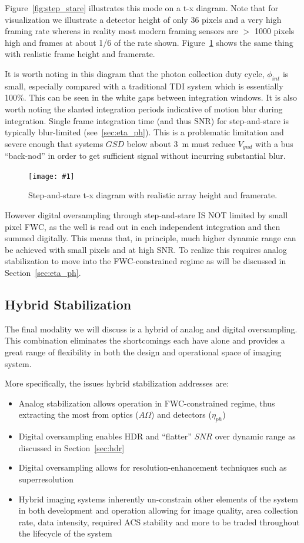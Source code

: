 \documentclass[]{spieman}  %
\newcommand{\includefigure}[3]
{
  \begin{figure}[h!tb]
  \centering
  \texttt{[image: \#1]}
  \caption[]{#3}
  \label{#2}
  \end{figure}
}
\begin{document}
Figure~\ref{fig:step_stare} illustrates this mode on a t-x diagram.  Note that for visualization we illustrate a detector height of only 36 pixels and a very high framing rate whereas in reality most modern framing sensors are $>$ 1000 pixels high and frames at about 1/6 of the rate shown.  Figure~\ref{fig:step_stare_real} shows the same thing with realistic frame height and framerate.

It is worth noting in this diagram that the photon collection duty cycle, $\phi_{int}$ is small, especially compared with a traditional TDI system which is essentially 100\%.  This can be seen in the white gaps between integration windows.  It is also worth noting the slanted integration periods indicative of motion blur during integration.  Single frame integration time (and thus SNR) for step-and-stare is typically blur-limited (see~\ref{sec:eta_ph}).  This is a problematic limitation and severe enough that systems $GSD$ below about 3~m must reduce $V_{gnd}$ with a bus ``back-nod'' in order to get sufficient signal without incurring substantial blur.

\includefigure{figures/step_stare_real.pgf}{fig:step_stare_real}{Step-and-stare t-x diagram with realistic array height and framerate.}

However digital oversampling through step-and-stare IS NOT limited by small pixel FWC, as the well is read out in each independent integration and then summed digitally.  This means that, in principle, much higher dynamic range can be achieved with small pixels and at high SNR.  To realize this requires analog stabilization to move into the FWC-constrained regime as will be discussed in Section~\ref{sec:eta_ph}.

\subsection{Hybrid Stabilization}

The final modality we will discuss is a hybrid of analog and digital oversampling.  This combination eliminates the shortcomings each have alone and provides a great range of flexibility in both the design and operational space of imaging system.

More specifically, the issues hybrid stabilization addresses are:

\begin{itemize}
    \item Analog stabilization allows operation in FWC-constrained regime, thus extracting the most from optics ($A\Omega$) and detectors ($\eta_{ph}$)
    \item Digital oversampling enables HDR and ``flatter'' $SNR$ over dynamic range as discussed in Section~\ref{sec:hdr}
    \item Digital oversampling allows for resolution-enhancement techniques such as superresolution
    \item Hybrid imaging systems inherently un-constrain other elements of the system in both development and operation allowing for image quality, area collection rate, data intensity, required ACS stability and more to be traded throughout the lifecycle of the system
\end{itemize}
\end{document}
